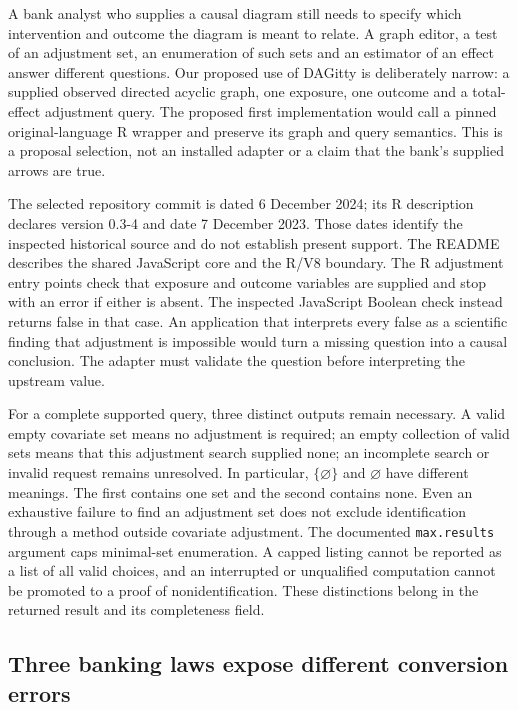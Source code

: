 A bank analyst who supplies a causal diagram still needs to specify which
intervention and outcome the diagram is meant to relate. A graph editor, a
test of an adjustment set, an enumeration of such sets and an estimator of an
effect answer different questions. Our proposed use of DAGitty is deliberately
narrow: a supplied observed directed acyclic graph, one exposure, one outcome
and a total-effect adjustment query. The proposed first implementation would
call a pinned original-language R wrapper and preserve its graph and query
semantics. This is a proposal selection, not an installed adapter or a claim
that the bank's supplied arrows are true.
\citep{exec18_gp_dagitty}

The selected repository commit is dated 6 December 2024; its R description
declares version 0.3-4 and date 7 December 2023. Those dates identify the
inspected historical source and do not establish present support. The README
describes the shared JavaScript core and the R/V8 boundary. The R adjustment
entry points check that exposure and outcome variables are supplied and stop
with an error if either is absent. The inspected JavaScript Boolean check
instead returns false in that case. An application that interprets every false
as a scientific finding that adjustment is impossible would turn a missing
question into a causal conclusion. The adapter must validate the question
before interpreting the upstream value. \citep{exec18_gp_dagitty}

For a complete supported query, three distinct outputs remain necessary.
A valid empty covariate set means no adjustment is required; an empty
collection of valid sets means that this adjustment search supplied none;
an incomplete search or invalid request remains unresolved. In particular,
\(\{\varnothing\}\) and \(\varnothing\) have different meanings. The first
contains one set and the second contains none. Even an exhaustive failure
to find an adjustment set does not exclude identification through a method
outside covariate adjustment. The documented \texttt{max.results} argument
caps minimal-set enumeration. A capped listing cannot be reported as a list
of all valid choices, and an interrupted or unqualified computation cannot
be promoted to a proof of nonidentification. These distinctions belong in
the returned result and its completeness field. \citep{exec18_gp_dagitty}

\subsection{Three banking laws expose different conversion errors}
\label{exec18:gp-graph-laws}

